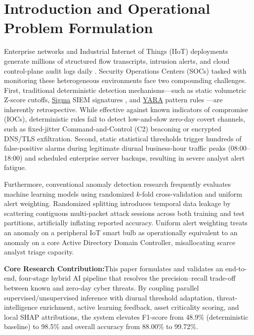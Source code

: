 \documentclass[10pt,a4paper]{article}
\newcommand{\takeaway}[2]{%
  \vspace{6pt}\noindent\colorbox{accent!6}{%
    \parbox{\dimexpr\textwidth-2\fboxsep\relax}{%
      \vspace{4pt}\textbf{\color{primary}#1:}\hspace{0.5em}#2\vspace{4pt}%
    }%
  }\vspace{6pt}%
}
\begin{document}
\section{Introduction and Operational Problem Formulation}
Enterprise networks and Industrial Internet of Things (IIoT) deployments generate millions of structured flow transcripts, intrusion alerts, and cloud control-plane audit logs daily \cite{zeek,suricata,cloudtrail}. Security Operations Centers (SOCs) tasked with monitoring these heterogeneous environments face two compounding challenges. First, traditional deterministic detection mechanisms---such as static volumetric Z-score cutoffs, \href{https://sigmahq.io/}{Sigma} SIEM signatures \cite{sigma}, and \href{https://virustotal.github.io/yara/}{YARA} pattern rules \cite{yara}---are inherently retrospective. While effective against known indicators of compromise (IOCs), deterministic rules fail to detect low-and-slow zero-day covert channels, such as fixed-jitter Command-and-Control (C2) beaconing or encrypted DNS/TLS exfiltration. Second, static statistical thresholds trigger hundreds of false-positive alarms during legitimate diurnal business-hour traffic peaks (08:00--18:00) and scheduled enterprise server backups, resulting in severe analyst alert fatigue.

Furthermore, conventional anomaly detection research frequently evaluates machine learning models using randomized $k$-fold cross-validation and uniform alert weighting. Randomized splitting introduces temporal data leakage by scattering contiguous multi-packet attack sessions across both training and test partitions, artificially inflating reported accuracy. Uniform alert weighting treats an anomaly on a peripheral IoT smart bulb as operationally equivalent to an anomaly on a core Active Directory Domain Controller, misallocating scarce analyst triage capacity.

\takeaway{Core Research Contribution}{This paper formulates and validates an end-to-end, four-stage hybrid AI pipeline that resolves the precision--recall trade-off between known and zero-day cyber threats. By coupling parallel supervised/unsupervised inference with diurnal threshold adaptation, threat-intelligence enrichment, active learning feedback, asset criticality scoring, and local SHAP attributions, the system elevates F1-score from 48.9\% (deterministic baseline) to 98.5\% and overall accuracy from 88.00\% to 99.72\%.}
\end{document}
